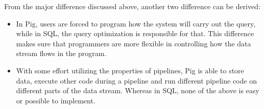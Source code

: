 \documentclass{article}
\begin{document}
From the major difference discussed above, another two difference can be derived:
\begin{itemize}
\item In Pig, users are forced to program how the system will carry
  out the query, while in SQL, the query optimization is responsible
  for that. This difference makes sure that programmers are more
  flexible in controlling how the data stream flows in the program.
\item With some effort utilizing the properties of pipelines, Pig is
  able to store data, execute other code during a pipeline and run
  different pipeline code on different parts of the data
  stream. Whereas in SQL, none of the above is easy or possible to
  implement.
\end{itemize}
\end{document}
